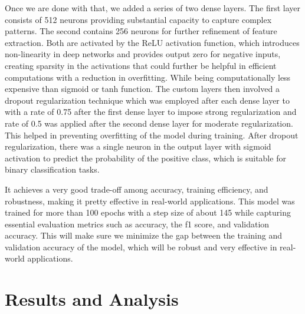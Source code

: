 \documentclass{ieeeaccess}
\begin{document}
Once we are done with that, we added a series of two dense layers. The first layer consists of 512 neurons providing substantial capacity to capture complex patterns. The second contains 256 neurons for further refinement of feature extraction. Both are activated by the ReLU activation function, which introduces non-linearity in deep networks and provides output zero for negative inputs, creating sparsity in the activations that could further be helpful in efficient computations with a reduction in overfitting. While being computationally less expensive than sigmoid or tanh function. The custom layers then involved a dropout regularization technique which was employed after each dense layer to with a rate of 0.75 after the first dense layer to impose strong regularization and rate of 0.5 was applied after the second dense layer for moderate regularization. This helped in preventing overfitting of the model during training. After dropout regularization, there was a single neuron in the output layer with sigmoid activation to predict the probability of the positive class, which is suitable for binary classification tasks.

It achieves a very good trade-off among accuracy, training efficiency, and robustness, making it pretty effective in real-world applications. This model was trained for more than 100 epochs with a step size of about 145 while capturing essential evaluation metrics such as accuracy, the f1 score, and validation accuracy. This will make sure we minimize the gap between the training and validation accuracy of the model, which will be robust and very effective in real-world applications.



\section{Results and Analysis}
\end{document}
